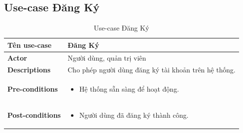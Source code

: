 \subsection{Use-case Đăng Ký}
    \begin{longtable}[H]{|l|p{}|}
        \caption{Use-case Đăng Ký}
        \\ \hline
        \textbf{Tên use-case} & Đăng Ký \\
        \hline
        \textbf{Actor} & Người dùng, quản trị viên \\
        \hline
        \textbf{Descriptions} & Cho phép người dùng đăng ký tài khoản trên hệ thống. \\
        \hline
        \textbf{Pre-conditions} & \vspace{-0.75cm} \begin{itemize}[leftmargin=4mm]
            \setlength\itemsep{0em}
            \item Hệ thống sẵn sàng để hoạt động.
        \end{itemize} \\
            
        \hline
    
        \textbf{Post-conditions} & \vspace{-0.75cm}  \begin{itemize} [leftmargin=4mm]
            \setlength\itemsep{0em}
            \item Người dùng đã đăng ký thành công.
        \end{itemize} \\
                
        \hline
            

\end{longtable}
